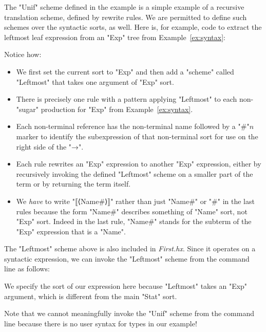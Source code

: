 \documentclass[11pt]{article} %
\begin{document}
\begin{example}\label{ex:leftmost}
  The "Unif" scheme defined in the example is a simple example of a recursive translation scheme,
  defined by rewrite rules.  We are permitted to define such schemes over the syntactic sorts, as
  well.  Here is, for example, code to extract the leftmost leaf expression from an "Exp" tree from
  Example~\ref{ex:syntax}:
  Notice how:
  \begin{itemize}

  \item We first set the current sort to "Exp" and then add a "scheme" called "Leftmost" that takes
    one argument of "Exp" sort.

  \item There is precisely one rule with a pattern applying "Leftmost" to each non-"sugar"
    production for "Exp" from Example~\ref{ex:syntax}.

  \item Each non-terminal reference has the non-terminal name followed by a "#"$n$ marker to
    identify the subexpression of that non-terminal sort for use on the right side of the "→".

  \item Each rule rewrites an "Exp" expression to another "Exp" expression, either by recursively
    invoking the defined "Leftmost" scheme on a smaller part of the term or by returning the term
    itself.

  \item We \emph{have} to write "⟦⟨Name#⟩⟧" rather than just "Name#" or "#" in the last rules
    because the form "Name#" describes something of "Name" sort, not "Exp" sort.  Indeed in the last
    rule, "Name#" stands for the subterm of the "Exp" expression that is a "Name".

  \end{itemize}
\end{example}

\begin{commands}
  The "Leftmost" scheme above is also included in \emph{First.hx}.  Since it operates on a syntactic
  expression, we can invoke the "Leftmost" scheme from the command line as follows:
  We specify the sort of our expression here because "Leftmost" takes an "Exp" argument, which is
  different from the main "Stat" sort.

  Note that we cannot meaningfully invoke the "Unif" scheme from the command line because there is
  no user syntax for types in our example!
\end{commands}
\end{document}
